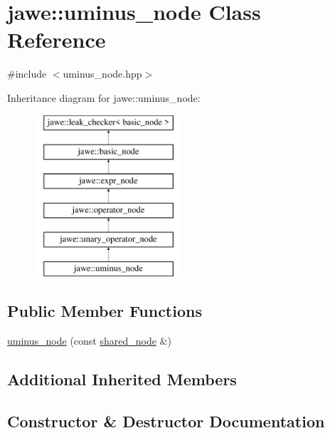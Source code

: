 \hypertarget{classjawe_1_1uminus__node}{}\section{jawe\+:\+:uminus\+\_\+node Class Reference}
\label{classjawe_1_1uminus__node}


{\ttfamily \#include $<$uminus\+\_\+node.\+hpp$>$}

Inheritance diagram for jawe\+:\+:uminus\+\_\+node\+:\begin{figure}[H]
\begin{center}
\leavevmode
\includegraphics[height=6.000000cm]{classjawe_1_1uminus__node}
\end{center}
\end{figure}
\subsection*{Public Member Functions}
\begin{DoxyCompactItemize}
\item 
\hyperlink{classjawe_1_1uminus__node_a62bafcc55ea951b0ea019851a66d844a}{uminus\+\_\+node} (const \hyperlink{namespacejawe_a3f307481d921b6cbb50cc8511fc2b544}{shared\+\_\+node} \&)
\end{DoxyCompactItemize}
\subsection*{Additional Inherited Members}


\subsection{Constructor \& Destructor Documentation}
\mbox{\label{classjawe_1_1uminus__node_a62bafcc55ea951b0ea019851a66d844a}} 

